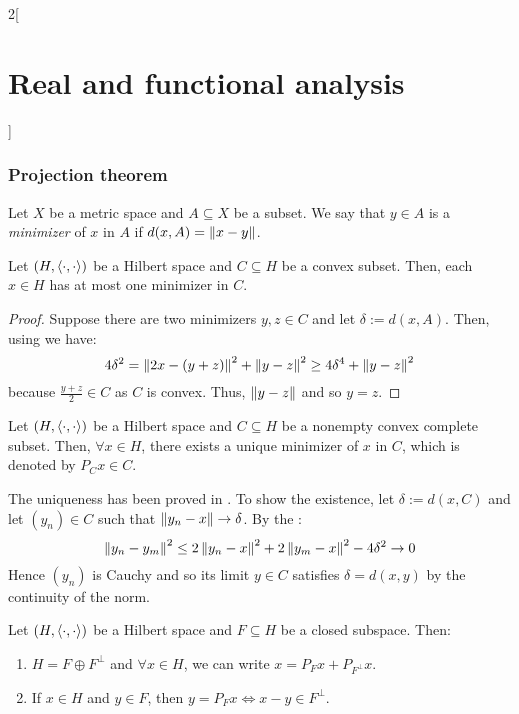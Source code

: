 \documentclass[../../../main_math.tex]{subfiles}
\begin{document}
\begin{multicols}{2}[\section{Real and functional analysis}]
  \subsubsection{Projection theorem}
  \begin{definition}
    Let $X$ be a metric space and $A\subseteq X$ be a subset. We say that $y\in A$ is a \emph{minimizer} of $x$ in $A$ if $d(x, A)=\left\|x-y\right\|$.
  \end{definition}
  \begin{proposition}\label{RFA:minimizeruniqueness}
    Let $(H,{\left\langle\cdot,\cdot\right\rangle})$ be a Hilbert space and $C\subseteq H$ be a convex subset. Then, each $x\in H$ has at most one minimizer in $C$.
  \end{proposition}
  \begin{proof}
    Suppose there are two minimizers $y,z\in C$ and let $\delta:=d(x,A)$. Then, using  we have:
    $$4\delta^2=\left\|2x-(y+z)\right\|^2+\left\|y-z\right\|^2\geq 4\delta^4+\left\|y-z\right\|^2$$
    because $\frac{y+z}{2}\in C$ as $C$ is convex. Thus, $\left\|y-z\right\|$ and so $y=z$.
  \end{proof}
  \begin{theorem}
    Let $(H,{\left\langle\cdot,\cdot\right\rangle})$ be a Hilbert space and $C\subseteq H$ be a nonempty convex complete subset. Then, $\forall x\in H$, there exists a unique minimizer of $x$ in $C$, which is denoted by $P_Cx\in C$.
  \end{theorem}
  \begin{sproof}
    The uniqueness has been proved in . To show the existence, let $\delta:=d(x,C)$ and let $(y_n)\in C$ such that $\left\|y_n-x\right\|\to \delta$. By the :
    $$\left\|y_n-y_m\right\|^2\leq 2\left\|y_n-x\right\|^2+2\left\|y_m-x\right\|^2 - 4\delta^2\to 0$$
    Hence $(y_n)$ is Cauchy and so its limit $y\in C$ satisfies $\delta=d(x,y)$ by the continuity of the norm.
  \end{sproof}
  \begin{important}
    \begin{theorem}\label{RFA:projection}
      Let $(H,{\left\langle\cdot,\cdot\right\rangle})$ be a Hilbert space and $F\subseteq H$ be a closed subspace. Then:
      \begin{enumerate}
        \item\label{RFA:projA} $H=F\oplus F^\perp$ and $\forall x\in H$, we can write $x=P_Fx+P_{F^\perp}x$.
        \item If $x\in H$ and $y\in F$, then $y=P_Fx\iff x-y\in F^\perp$.
      \end{enumerate}

\end{theorem}
\end{important}
\end{multicols}
\end{document}
